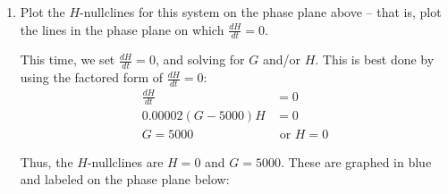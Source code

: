 \documentclass[main]{subfiles}
\begin{document}
\begin{enumerate}
\begin{enumerate}
\begin{solution}
Thus, the $G$-nullclines are $\boxed{G=0}$ and $\boxed{H=100}$. These are graphed in red and labeled on the phase plane below:

\begin{center}
\end{center}

Notice that we only need to plot the first quadrant of the phase plane, as we can assume that the gazelle and hyena populations are always non-negative.

\end{solution}
       
\item 
\begin{problem}[0.5in]
Plot the $H$-nullclines for this system on the phase plane above -- that is, plot the lines in the phase plane on which $\frac{dH}{dt} = 0$. 
\end{problem}


\begin{solution}
This time, we set $\displaystyle \frac{dH}{dt} = 0$, and solving for $G$ and/or $H$. This is best done by using the factored form of $\displaystyle \frac{dH}{dt} = 0$:
\begin{align*}
\frac{dH}{dt} &= 0\\
0.00002(G-5000) H&=0\\
G=5000 &\text{ or } H=0
\end{align*}

Thus, the $H$-nullclines are $\boxed{H=0}$ and $\boxed{G=5000}$. These are graphed in blue and labeled on the phase plane below:



\end{solution}
\end{enumerate}
\end{enumerate}
\end{document}
